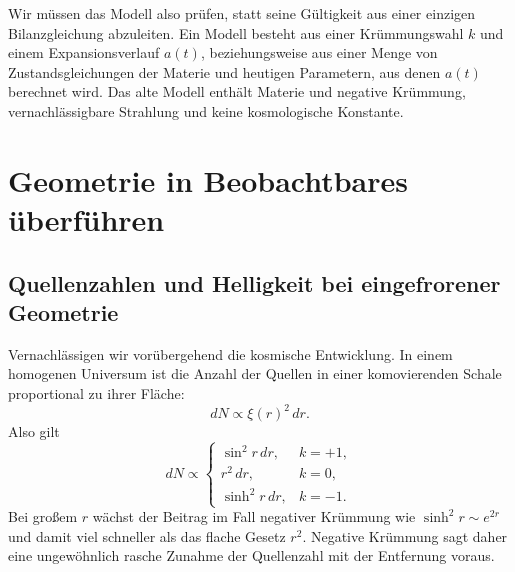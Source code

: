 \begin{classroomqa}
\end{classroomqa}

Wir müssen das Modell also prüfen, statt seine Gültigkeit aus einer einzigen Bilanzgleichung abzuleiten. Ein Modell besteht aus einer Krümmungswahl \(k\) und einem Expansionsverlauf \(a(t)\), beziehungsweise aus einer Menge von Zustandsgleichungen der Materie und heutigen Parametern, aus denen \(a(t)\) berechnet wird. Das alte Modell enthält Materie und negative Krümmung, vernachlässigbare Strahlung und keine kosmologische Konstante.

\section{Geometrie in Beobachtbares überführen}

\subsection{Quellenzahlen und Helligkeit bei eingefrorener Geometrie}

Vernachlässigen wir vorübergehend die kosmische Entwicklung. In einem homogenen Universum ist die Anzahl der Quellen in einer komovierenden Schale proportional zu ihrer Fläche:
\begin{equation}
dN\propto \xi(r)^2\,dr.
\label{eq:c06-shell-count}
\end{equation}
Also gilt
\begin{equation}
dN\propto
\begin{cases}
\sin^2r\,dr, & k=+1,\\
r^2\,dr, & k=0,\\
\sinh^2r\,dr, & k=-1.
\end{cases}
\end{equation}
Bei großem \(r\) wächst der Beitrag im Fall negativer Krümmung wie \(\sinh^2r\sim e^{2r}\) und damit viel schneller als das flache Gesetz \(r^2\). Negative Krümmung sagt daher eine ungewöhnlich rasche Zunahme der Quellenzahl mit der Entfernung voraus.

